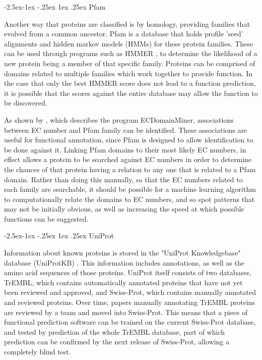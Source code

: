 \documentclass[12pt]{article}
\makeatletter
\renewcommand\subsubsection{\@startsection{subsubsection}{4}{\z@}
            {-2.5ex\@plus -1ex \@minus -.25ex}
            {1ex \@plus .25ex}
            {\normalfont\large\bfseries}}
\makeatother
\begin{document}
			\subsubsection{Pfam}

			Another way that proteins are classified is by homology, providing families that evolved from a common ancestor.  Pfam \citep{RefWorks:doc:5d6e641de4b0a51fb0eed90f} is a database that holds profile 'seed' alignments and hidden markov models (HMMs) for these protein families.  These can be used through programs such as HMMER \citep{RefWorks:doc:5c8f77ece4b077fbbf563f6a}, to determine the likelihood of a new protein being a member of that specific family. Proteins can be comprised of domains related to multiple families which work together to provide function.  In the case that only the best HMMER score does not lead to a function prediction, it is possible that the scores against the entire database may allow the function to be discovered.
					
			As shown by \cite{RefWorks:doc:5d6f9c26e4b0ec3eed182252}, which describes the program ECDomainMiner, associations between EC number and Pfam family can be identified.  These associations are useful for functional annotation, since Pfam is designed to allow identification to be done against it.  Linking Pfam domains to their most likely EC numbers, in effect allows a protein to be searched against EC numbers in order to determine the chances of that protein having a relation to any one that is related to a Pfam domain.  Rather than doing this manually, so that the EC numbers related to each family are searchable, it should be possible for a machine learning algorithm to computationally relate the domains to EC numbers, and so spot patterns that may not be initially obvious, as well as increasing the speed at which possible functions can be suggested.
			
			\subsubsection{UniProt}
		
			Information about known proteins is stored in the "UniProt Knowledgebase" database (UniProtKB) \citep{RefWorks:doc:5d80d882e4b074875bbeabb7}.  This information includes annotations, as well as the amino acid sequences of those proteins.  UniProt itself consists of two databases, TrEMBL, which contains automatically annotated proteins that have not yet been reviewed and approved, and Swiss-Prot, which contains manually annotated and reviewed proteins.  Over time, papers manually annotating TrEMBL proteins are reviewed by a team and moved into Swiss-Prot.  This means that a piece of functional prediction software can be trained on the current Swiss-Prot database, and tested by prediction of the whole TrEMBL database, part of which prediction can be confirmed by the next release of Swiss-Prot, allowing a completely blind test. 
			
\end{document}
